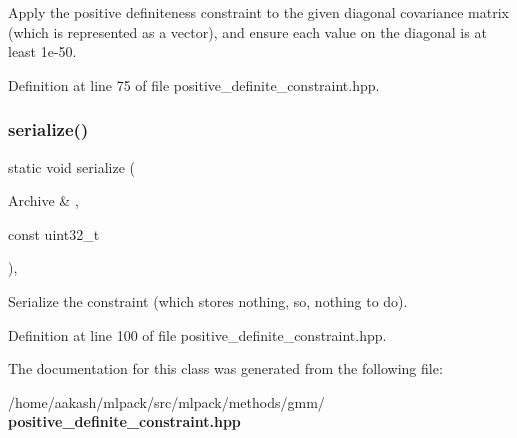 Apply the positive definiteness constraint to the given diagonal covariance matrix (which is represented as a vector), and ensure each value on the diagonal is at least 1e-\/50. 



Definition at line 75 of file positive\+\_\+definite\+\_\+constraint.\+hpp.

\mbox{\label{classmlpack_1_1gmm_1_1PositiveDefiniteConstraint_a408eb4ebf27591742383f36e84641a80}} 
\subsubsection{serialize()}
{\footnotesize\ttfamily static void serialize (\begin{DoxyParamCaption}\item[{Archive \&}]{,  }\item[{const uint32\+\_\+t}]{ }\end{DoxyParamCaption})\hspace{0.3cm}{\ttfamily [inline]}, {\ttfamily [static]}}



Serialize the constraint (which stores nothing, so, nothing to do). 



Definition at line 100 of file positive\+\_\+definite\+\_\+constraint.\+hpp.



The documentation for this class was generated from the following file\+:\begin{DoxyCompactItemize}
\item 
/home/aakash/mlpack/src/mlpack/methods/gmm/\textbf{ positive\+\_\+definite\+\_\+constraint.\+hpp}\end{DoxyCompactItemize}
